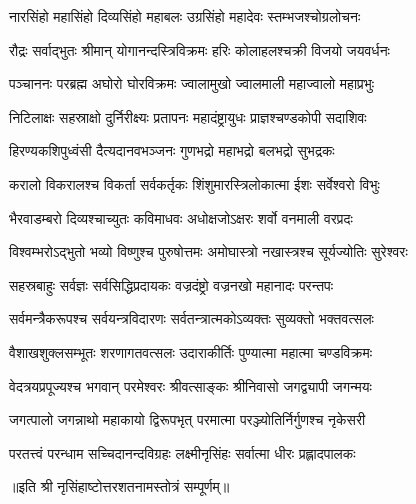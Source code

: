 

\twolineshloka
{नारसिंहो महासिंहो दिव्यसिंहो महाबलः}
{उग्रसिंहो महादेवः स्तम्भजश्चोग्रलोचनः}

\twolineshloka
{रौद्रः सर्वाद्भुतः श्रीमान् योगानन्दस्त्रिविक्रमः}
{हरिः कोलाहलश्चक्री विजयो जयवर्धनः}

\twolineshloka
{पञ्चाननः परब्रह्म अघोरो घोरविक्रमः}
{ज्वालामुखो ज्वालमाली महाज्वालो महाप्रभुः}

\twolineshloka
{निटिलाक्षः सहस्राक्षो दुर्निरीक्ष्यः प्रतापनः}
{महादंष्ट्रायुधः  प्राज्ञश्चण्डकोपी सदाशिवः}

\twolineshloka
{हिरण्यकशिपुध्वंसी दैत्यदानवभञ्जनः}
{गुणभद्रो महाभद्रो बलभद्रो सुभद्रकः}

\twolineshloka
{करालो विकरालश्च विकर्ता सर्वकर्तृकः}
{शिंशुमारस्त्रिलोकात्मा ईशः सर्वेश्वरो विभुः}

\twolineshloka
{भैरवाडम्बरो दिव्यश्चाच्युतः कविमाधवः}
{अधोक्षजोऽक्षरः शर्वो वनमाली वरप्रदः}

\twolineshloka
{विश्वम्भरोऽद्भुतो भव्यो विष्णुश्च पुरुषोत्तमः}
{अमोघास्त्रो नखास्त्रश्च सूर्यज्योतिः सुरेश्वरः}

\twolineshloka
{सहस्रबाहुः सर्वज्ञः सर्वसिद्धिप्रदायकः}
{वज्रदंष्ट्रो वज्रनखो महानादः परन्तपः}

\twolineshloka
{सर्वमन्त्रैकरूपश्च सर्वयन्त्रविदारणः}
{सर्वतन्त्रात्मकोऽव्यक्तः सुव्यक्तो भक्तवत्सलः}

\twolineshloka
{वैशाखशुक्लसम्भूतः शरणागतवत्सलः}
{उदाराकीर्तिः पुण्यात्मा महात्मा चण्डविक्रमः}

\twolineshloka
{वेदत्रयप्रपूज्यश्च भगवान् परमेश्वरः}
{श्रीवत्साङ्कः श्रीनिवासो जगद्व्यापी  जगन्मयः}

\twolineshloka
{जगत्पालो जगन्नाथो महाकायो द्विरूपभृत्}
{परमात्मा परञ्ज्योतिर्निर्गुणश्च नृकेसरी}

\twolineshloka
{परतत्त्वं परन्धाम सच्चिदानन्दविग्रहः}
{लक्ष्मीनृसिंहः सर्वात्मा धीरः प्रह्लादपालकः}

॥इति श्री नृसिंहाष्टोत्तरशतनामस्तोत्रं सम्पूर्णम्॥
